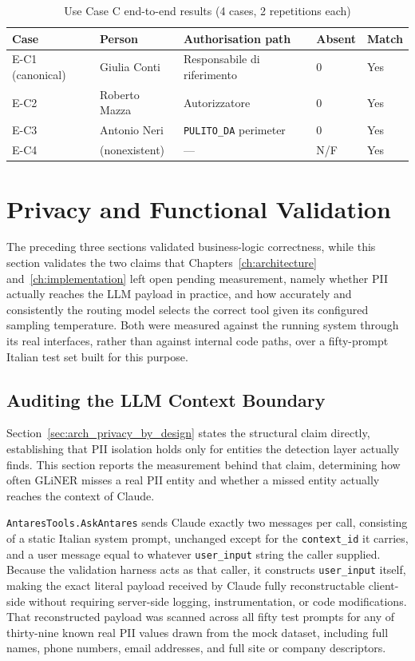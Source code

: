 \begin{table}[htbp]
\centering
\caption{Use Case C end-to-end results (4 cases, 2 repetitions each)}
\label{tab:ucc_e2e}
\small
\begin{tabular}{l l p{3.6cm} l l}
\hline
\textbf{Case} & \textbf{Person} & \textbf{Authorisation path} & \textbf{Absent} & \textbf{Match} \\
\hline
E-C1 (canonical) & Giulia Conti & Responsabile di riferimento & 0 & Yes \\
E-C2 & Roberto Mazza & Autorizzatore & 0 & Yes \\
E-C3 & Antonio Neri & \texttt{PULITO\_DA} perimeter & 0 & Yes \\
E-C4 & (nonexistent) & --- & N/F & Yes \\
\hline
\end{tabular}
\end{table}

\section{Privacy and Functional Validation}
\label{sec:usecases_validation}

The preceding three sections validated business-logic correctness, while this section validates the two claims that Chapters~\ref{ch:architecture} and~\ref{ch:implementation} left open pending measurement, namely whether PII actually reaches the LLM payload in practice, and how accurately and consistently the routing model selects the correct tool given its configured sampling temperature. Both were measured against the running system through its real interfaces, rather than against internal code paths, over a fifty-prompt Italian test set built for this purpose.

\subsection{Auditing the LLM Context Boundary}
\label{subsec:usecases_llm_audit}

Section~\ref{sec:arch_privacy_by_design} states the structural claim directly, establishing that PII isolation holds only for entities the detection layer actually finds. This section reports the measurement behind that claim, determining how often GLiNER misses a real PII entity and whether a missed entity actually reaches the context of Claude.

\texttt{AntaresTools.AskAntares} sends Claude exactly two messages per call, consisting of a static Italian system prompt, unchanged except for the \texttt{context\_id} it carries, and a user message equal to whatever \texttt{user\_input} string the caller supplied. Because the validation harness acts as that caller, it constructs \texttt{user\_input} itself, making the exact literal payload received by Claude fully reconstructable client-side without requiring server-side logging, instrumentation, or code modifications. That reconstructed payload was scanned across all fifty test prompts for any of thirty-nine known real PII values drawn from the mock dataset, including full names, phone numbers, email addresses, and full site or company descriptors.

